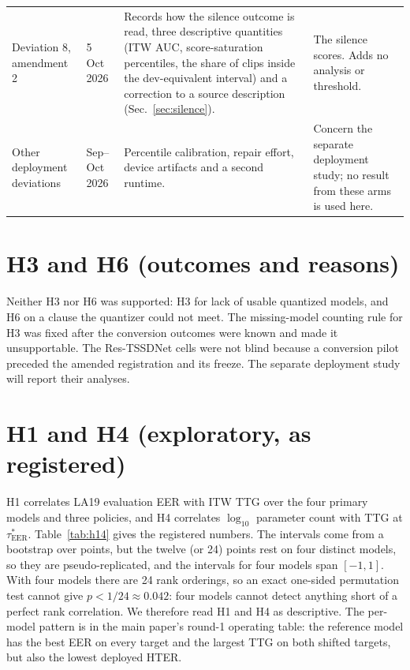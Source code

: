 \documentclass[10pt]{article}
\newcommand{\tauE}{\tau^{*}_{\mathrm{EER}}}
\begin{document}
\begin{table}[!ht]
\begin{tabular}{@{}p{}p{}p{}p{}@{}}
Deviation 8, amendment 2 & 5 Oct 2026 & Records how the silence outcome is read, three descriptive quantities (ITW AUC, score-saturation percentiles, the share of
clips inside the dev-equivalent interval) and a correction to a source description (Sec.~\ref{sec:silence}). & The silence scores. Adds no analysis or threshold. \\
Other deployment deviations & Sep--Oct 2026 & Percentile calibration, repair effort, device artifacts and a second runtime. & Concern the separate deployment study; no result from these arms is used here. \\
\bottomrule
\end{tabular}
\end{table}

\section{H3 and H6 (outcomes and reasons)}
\label{sec:h3h6}
Neither H3 nor H6 was supported: H3 for lack of usable quantized models, and H6 on a clause the quantizer could not meet.
The missing-model counting rule for H3 was fixed after the conversion outcomes were known and made it unsupportable.
The Res-TSSDNet cells were not blind because a conversion pilot preceded the amended registration and its freeze. The separate deployment
study will report their analyses.

\section{H1 and H4 (exploratory, as registered)}
H1 correlates LA19 evaluation EER with ITW TTG over the four primary models and three policies, and H4 correlates \(\log_{10}\) parameter
count with TTG at \(\tauE\). Table~\ref{tab:h14} gives the registered numbers. The intervals come from a bootstrap over points, but the
twelve (or 24) points rest on four distinct models, so they are pseudo-replicated, and the intervals for four models span \([-1,1]\). With
four models there are 24 rank orderings, so an exact one-sided permutation test cannot give \(p<1/24\approx0.042\): four models cannot
detect anything short of a perfect rank correlation. We therefore read H1 and H4 as descriptive. The per-model pattern is in the main paper's round-1 operating table: the reference model has the best EER on every target and the largest TTG on both shifted targets, but also the lowest deployed
HTER.
\end{document}
